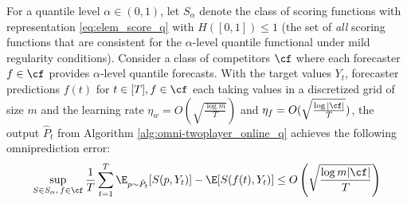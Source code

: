   \begin{theorem}
    \label{thm:omni-twoplayer_online_q}
    For a quantile level $\alpha \in (0,1)$, let $S_\alpha$ denote the class of scoring functions with representation \eqref{eq:elem_score_q} with $H([0,1]) \leq 1$ (the set of \textit{all} scoring functions that are consistent for the $\alpha$-level quantile functional under mild regularity conditions). Consider a class of competitors $\cf$ where each forecaster $f \in \cf$ provides $\alpha$-level quantile forecasts. With the target values $Y_t$, forecaster predictions $f(t)$ for $t \in [T], f \in \cf$ each taking values in a discretized grid of size $m$ and the learning rate $\eta_w = O(\sqrt{\frac{\log m}{T}})$ and $\eta_f = O(\sqrt{\frac{\log |\cf|}{T}})$, the output $\hat{P}_t$ from Algorithm \ref{alg:omni-twoplayer_online_q} achieves the following omniprediction error:
    \begin{align*}
    \sup_{S \in S_\alpha,\, f \in \cf} \frac{1}{T} \sum_{t=1}^T \E_{p \sim \hat{P}_t} [S(p, Y_t)] - \E[S(f(t), Y_t)]
    \leq O\left(\sqrt{\frac{\log m|\cf|}{T}}\right)
    \end{align*}
  \end{theorem}
  
